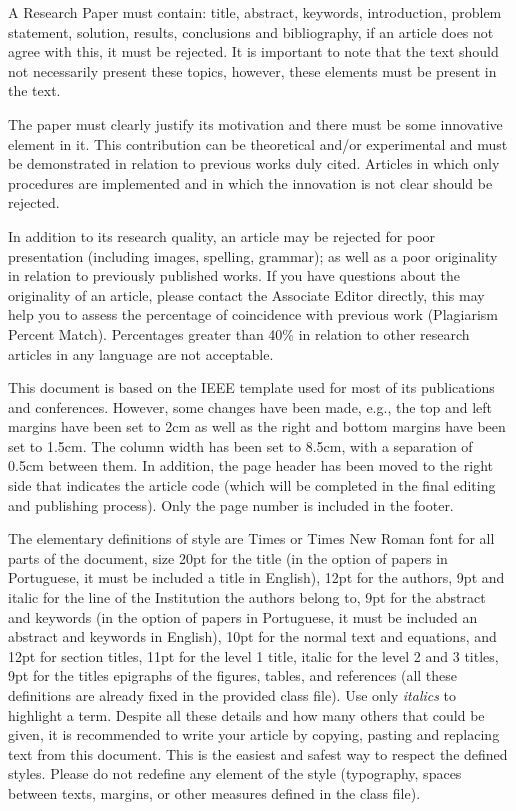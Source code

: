 \documentclass[eng]{ajceam-class}
\begin{document}
A Research Paper must contain: title, abstract, keywords, introduction, problem statement, solution, results, conclusions and bibliography, if an article does not agree with this, it must be rejected. It is important to note that the text should not necessarily present these topics, however, these elements must be present in the text.

The paper must clearly justify its motivation and there must be some innovative element in it. This contribution can be theoretical and/or experimental and must be demonstrated in relation to previous works duly cited. Articles in which only procedures are implemented and in which the innovation is not clear should be rejected.

In addition to its research quality, an article may be rejected for poor presentation (including images, spelling, grammar); as well as a poor originality in relation to previously published works. If you have questions about the originality of an article, please contact the Associate Editor directly, this may help you to assess the percentage of coincidence with previous work (Plagiarism Percent Match). Percentages greater than 40\% in relation to other research articles in any language are not acceptable.

This document is based on the IEEE template used for most of its publications and conferences. However, some changes have been made, e.g., the top and left margins have been set to 2cm as well as the right and bottom margins have been set to 1.5cm. The column width has been set to 8.5cm, with a separation of 0.5cm between them. In addition, the page header has been moved to the right side that indicates the article code (which will be completed in the final editing and publishing process). Only the page number is included in the footer.

The elementary definitions of style are Times or Times New Roman font for all parts of the document, size 20pt for the title (in the option of papers in Portuguese, it must be included a title in English), 12pt for the authors, 9pt and italic for the line of the Institution the authors belong to, 9pt for the abstract and keywords (in the option of papers in Portuguese, it must be included an abstract and keywords in English), 10pt for the normal text and equations, and 12pt for section titles, 11pt for the level 1 title, italic for the level 2 and 3 titles, 9pt for the titles epigraphs of the figures, tables, and references (all these definitions are already fixed in the provided class file). Use only \emph{italics} to highlight a term. Despite all these details and how many others that could be given, it is recommended to write your article by copying, pasting and replacing text from this document. This is the easiest and safest way to respect the defined styles. Please do not redefine any element of the style (typography, spaces between texts, margins, or other measures defined in the class file).
\end{document}

